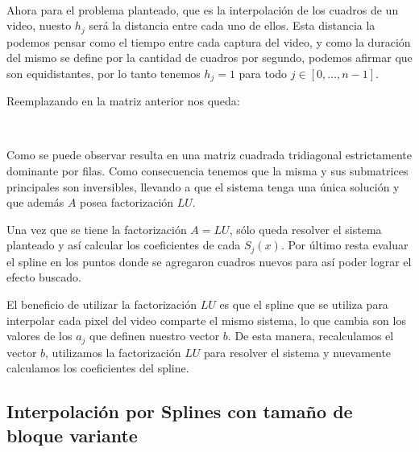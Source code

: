 ~

Ahora para el problema planteado, que es la interpolación de los cuadros de un
video, nuesto $h_j$ será la distancia entre cada uno de ellos. Esta distancia la
podemos pensar como el tiempo entre cada captura del video, y como la duración
del mismo se define por la cantidad de cuadros por segundo, podemos afirmar que
son equidistantes, por lo tanto tenemos $h_j = 1$ para todo $j \in [0, \dots,
n-1]$.

Reemplazando en la matriz anterior nos queda:

\setlength{\arraycolsep}{6pt}

~

Como se puede observar resulta en una matriz cuadrada tridiagonal estrictamente dominante
por filas. Como consecuencia tenemos que la misma y sus submatrices principales
son inversibles, llevando a que el sistema tenga una única solución y que además
$A$ posea factorización $LU$.

Una vez que se tiene la factorización $A = LU$, sólo queda resolver el sistema
planteado y así calcular los coeficientes de cada $S_j(x)$. Por último resta
evaluar el spline en los puntos donde se agregaron cuadros nuevos para así poder
lograr el efecto buscado.

El beneficio de utilizar la factorización $LU$ es que el spline que se utiliza
para interpolar cada pixel del video comparte el mismo sistema, lo que cambia
son los valores de los $a_j$ que definen nuestro vector $b$. De esta manera,
recalculamos el vector $b$, utilizamos la factorización $LU$ para resolver el
sistema y nuevamente calculamos los coeficientes del spline.

\subsection{Interpolación por Splines con tamaño de bloque variante}\label{MultiSplines}
